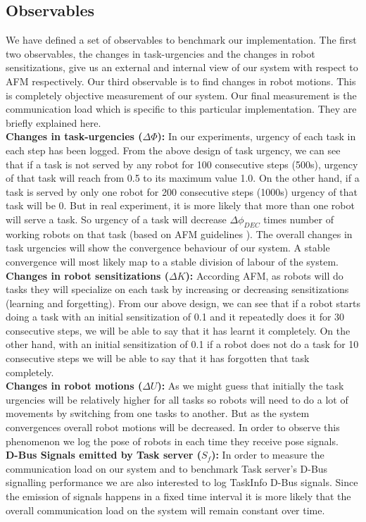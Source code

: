 \documentclass{llncs}
\begin{document}
\subsection{Observables}
We have defined a set of observables to benchmark our implementation. The first two observables, the changes in task-urgencies and the changes in robot sensitizations, give us an external and internal view of our system with respect to AFM respectively. Our third observable is to find changes in robot motions. This is completely objective measurement of our system. Our final measurement is the communication load which is specific to this particular implementation. They are briefly explained here.\\
\textbf{Changes in task-urgencies ($\Delta \Phi$): }
In our experiments, urgency of each task in each step has been logged. From the above design of task urgency, we can see that if a task is not served by any robot for 100 consecutive steps (500s), urgency of that task will reach from 0.5 to its maximum value 1.0. On the other hand, if a task is served by only one robot for 200 consecutive steps (1000s) urgency of that task will be 0. But in real experiment, it is more likely that more than one robot will serve a task. So urgency of a task will decrease $\Delta\phi_{DEC}$ times number of working robots on that task (based on AFM guidelines \cite{Elsa}). The overall changes in task urgencies will show the convergence behaviour of our system. A stable convergence will most likely map to a stable division of labour of the system.\\
\textbf{Changes in robot sensitizations ($\Delta K$): }
According AFM, as robots will do tasks they will specialize on each task by increasing or decreasing sensitizations (learning and forgetting). From our above design, we can see that if a robot starts doing a task with an initial sensitization of 0.1 and it repeatedly does it for 30 consecutive steps, we will be able to say that it has learnt it completely. On the other hand, with an initial sensitization of 0.1 if a robot does not do a task for 10 consecutive steps we will be able to say that it has forgotten that task completely.\\
\textbf{Changes in robot motions ($\Delta U$): }
As we might guess that initially the task urgencies will be relatively higher for all tasks so robots will need to do a lot of movements by switching from one tasks to another. But as the system convergences overall robot motions will be decreased. In order to observe this phenomenon we log the pose of robots in each time they receive pose signals.\\
\textbf{D-Bus Signals emitted by Task server ($S_f$):} 
In order to measure the communication load on our system and to benchmark Task server's D-Bus signalling performance we are also interested to log TaskInfo D-Bus signals. Since the emission of signals happens in a fixed time interval it is more likely that the overall communication load on the system will remain constant over time.
%
% 
\end{document}
